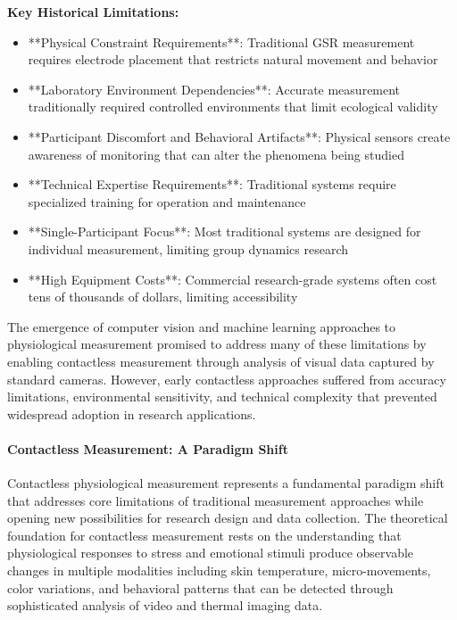 \documentclass[12pt,a4paper]{report}
\begin{document}
\textbf{Key Historical Limitations:}

\begin{itemize}
\item **Physical Constraint Requirements**: Traditional GSR measurement requires electrode placement that restricts natural
  movement and behavior
\item **Laboratory Environment Dependencies**: Accurate measurement traditionally required controlled environments that
  limit ecological validity
\item **Participant Discomfort and Behavioral Artifacts**: Physical sensors create awareness of monitoring that can alter
  the phenomena being studied
\item **Technical Expertise Requirements**: Traditional systems require specialized training for operation and maintenance
\item **Single-Participant Focus**: Most traditional systems are designed for individual measurement, limiting group
  dynamics research
\item **High Equipment Costs**: Commercial research-grade systems often cost tens of thousands of dollars, limiting
  accessibility

\end{itemize}
The emergence of computer vision and machine learning approaches to physiological measurement promised to address many
of these limitations by enabling contactless measurement through analysis of visual data captured by standard cameras.
However, early contactless approaches suffered from accuracy limitations, environmental sensitivity, and technical
complexity that prevented widespread adoption in research applications.

\paragraph{Contactless Measurement: A Paradigm Shift}

Contactless physiological measurement represents a fundamental paradigm shift that addresses core limitations of
traditional measurement approaches while opening new possibilities for research design and data collection. The
theoretical foundation for contactless measurement rests on the understanding that physiological responses to stress and
emotional stimuli produce observable changes in multiple modalities including skin temperature, micro-movements, color
variations, and behavioral patterns that can be detected through sophisticated analysis of video and thermal imaging
data.
\end{document}
